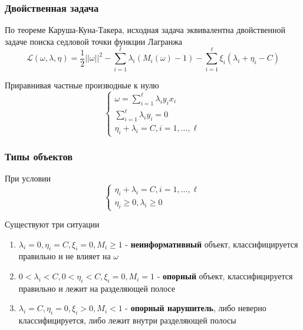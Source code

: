 \documentclass{beamer}
\begin{document}
	\begin{frame}
		\frametitle{Двойственная задача}
		По теореме Каруша-Куна-Такера, исходная задача эквивалентна двойственной задаче поиска седловой точки функции Лагранжа
		\[
		\mathcal{L}(\omega, \lambda, \eta) = 
		\frac{1}{2} ||\omega||^2 
		- \sum_{i=1}^{\ell} \lambda_i (M_i(\omega) - 1)
		- \sum_{i=1}^{\ell} \xi_i (\lambda_i + \eta_i - C)
		\]
		
		Приравнивая частные производные к нулю
		\[
		\begin{cases}
			\omega = \sum_{i=1}^{\ell} \lambda_i y_i x_i \\
			\sum_{i=1}^{\ell} \lambda_i y_i = 0 \\
			\eta_i + \lambda_i = C, i=1, ..., \ell
		\end{cases}
		\]
	\end{frame}
	
	\begin{frame}
		\frametitle{Типы объектов}
		 При условии
		 \[
		 \begin{cases}
		 	\eta_i + \lambda_i = C, i=1, ..., \ell \\
		 	\eta_i \ge 0, \lambda_i \ge 0
		 \end{cases}
		 \]
		 
		 Существуют три ситуации
		 \begin{enumerate}
		 	\item $\lambda_i = 0, \eta_i = C, \xi_i = 0, M_i \ge 1$
		 	- \textbf{неинформативный}  объект, классифицируется правильно и не влияет на $\omega$
		 	
		 	\item $0 < \lambda_i < C, 0 < \eta_i < C, \xi_i = 0, M_i = 1$
		 	- \textbf{опорный} объект, классифицируется правильно и лежит на разделяющей полосе
		 	
		 	\item $\lambda_i = C, \eta_i = 0, \xi_i > 0, M_i < 1$
		 	- \textbf{опорный нарушитель}, либо неверно классифицируется, либо лежит внутри разделяющей полосы
		 \end{enumerate}
	\end{frame}
	
\end{document}
